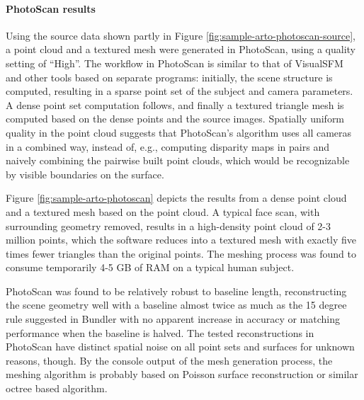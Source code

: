 \paragraph{PhotoScan results}
Using the source data shown partly in Figure \ref{fig:sample-arto-photoscan-source}, a point cloud and a textured mesh were generated in PhotoScan, using a quality setting of ``High''.
The workflow in PhotoScan is similar to that of VisualSFM and other tools based on separate programs:
initially, the scene structure is computed, resulting in a sparse point set of the subject and camera parameters.
A dense point set computation follows, and finally a textured triangle mesh is computed based on the dense points and the source images.
Spatially uniform quality in the point cloud suggests that PhotoScan's algorithm uses all cameras in a combined way, instead of, e.g., computing disparity maps in pairs and naively combining the pairwise built point clouds, which would be recognizable by visible boundaries on the surface.



Figure \ref{fig:sample-arto-photoscan} depicts the results from a dense point cloud and a textured mesh based on the point cloud.
A typical face scan, with surrounding geometry removed, results in a high-density point cloud of 2-3 million points, which the software reduces into a textured mesh with exactly five times fewer triangles than the original points.
The meshing process was found to consume temporarily 4-5 GB of RAM on a typical human subject.

PhotoScan was found to be relatively robust to baseline length, reconstructing the scene geometry well with a baseline almost twice as much as the 15 degree rule suggested in Bundler with no apparent increase in accuracy or matching performance when the baseline is halved.
The tested reconstructions in PhotoScan have distinct spatial noise on all point sets and surfaces for unknown reasons, though.
By the console output of the mesh generation process, the meshing algorithm is probably based on Poisson surface reconstruction or similar octree based algorithm.

